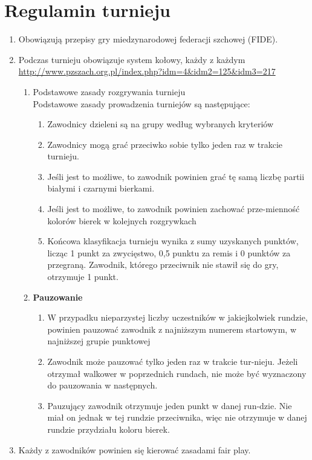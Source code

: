 \section{Regulamin turnieju}
\begin{enumerate}
	\item Obowiązują przepisy gry miedzynarodowej federacji szchowej (FIDE).
	\item Podczas turnieju obowiązuje system kołowy, każdy z każdym \url{http://www.pzszach.org.pl/index.php?idm=4&idm2=125&idm3=217}
	\begin{enumerate}
		\item Podstawowe zasady rozgrywania turnieju
		\\Podstawowe zasady prowadzenia turniejów są następujące:
\begin{enumerate}
\item Zawodnicy dzieleni są na grupy według wybranych kryteriów
\item Zawodnicy mogą grać przeciwko sobie tylko jeden raz w trakcie turnieju. 
\item Jeśli jest to możliwe, to zawodnik powinien grać tę samą liczbę partii białymi i czarnymi bierkami. 
\item Jeśli jest to możliwe, to zawodnik powinien zachować prze-mienność kolorów bierek w kolejnych rozgrywkach
\item Końcowa klasyfikacja turnieju wynika z sumy uzyskanych punktów, licząc 1 punkt za zwycięstwo, 0,5 punktu za remis i 0 punktów za przegraną. Zawodnik, którego przeciwnik nie stawił się do gry, otrzymuje 1 punkt.
\end{enumerate}
\item \textbf{Pauzowanie}
\begin{enumerate}
	\item W przypadku nieparzystej liczby uczestników w jakiejkolwiek rundzie, powinien pauzować zawodnik z najniższym numerem startowym, w najniższej grupie punktowej
	\item Zawodnik może pauzować tylko jeden raz w trakcie tur-nieju. Jeżeli otrzymał walkower w poprzednich rundach, nie może być wyznaczony do pauzowania w następnych.
	\item Pauzujący zawodnik otrzymuje jeden punkt w danej run-dzie. Nie miał on jednak w tej rundzie przeciwnika, więc nie otrzymuje w danej rundzie przydziału koloru bierek.
\end{enumerate}
	\end{enumerate}
	\item Każdy z zawodników powinien się kierować zasadami fair play.

\end{enumerate}
